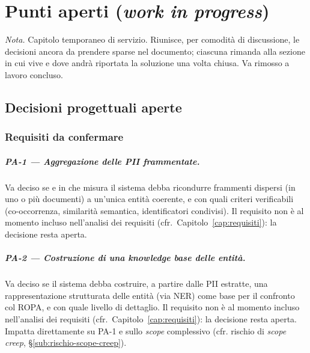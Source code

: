 
\chapter{Punti aperti (\emph{work in progress})}
\label{cap:punti-aperti}

\textit{Nota.} Capitolo temporaneo di servizio. Riunisce, per comodità di discussione, le decisioni ancora da prendere sparse nel documento; ciascuna rimanda alla sezione in cui vive e dove andrà riportata la soluzione una volta chiusa. Va rimosso a lavoro concluso.

\section{Decisioni progettuali aperte}
\label{sec:pa-decisioni}

\subsection{Requisiti da confermare}
\label{sub:pa-requisiti}

\paragraph{PA-1 — Aggregazione delle PII frammentate.} Va deciso se e in che misura il sistema debba ricondurre frammenti dispersi (in uno o più documenti) a un'unica entità coerente, e con quali criteri verificabili (co-occorrenza, similarità semantica, identificatori condivisi). Il requisito non è al momento incluso nell'analisi dei requisiti (cfr.~Capitolo~\ref{cap:requisiti}): la decisione resta aperta.

\paragraph{PA-2 — Costruzione di una knowledge base delle entità.} Va deciso se il sistema debba costruire, a partire dalle PII estratte, una rappresentazione strutturata delle entità (via NER) come base per il confronto col ROPA, e con quale livello di dettaglio. Il requisito non è al momento incluso nell'analisi dei requisiti (cfr.~Capitolo~\ref{cap:requisiti}): la decisione resta aperta. Impatta direttamente su PA-1 e sullo \emph{scope} complessivo (cfr. rischio di \emph{scope creep}, §\ref{sub:rischio-scope-creep}).

